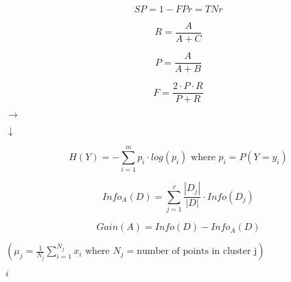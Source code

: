 \documentclass[10pt]{book}
\begin{document}
\begin{mdSnippets}
\begin{mdDisplaySnippet}
\[  SP = 1 - FPr = TNr
\]%
\end{mdDisplaySnippet}%
\begin{mdDisplaySnippet}[ba82f48a43ef0894d62cc5c64647ffde]%
\[%
  R = \frac{A}{A+C}
\]%
\end{mdDisplaySnippet}%
\begin{mdDisplaySnippet}%
\[%
  P = \frac{A}{A+B}
\]%
\end{mdDisplaySnippet}%
\begin{mdDisplaySnippet}[ed20a79ddbdd6c86e3ce04fd31c21666]%
\[%
  F = \frac{2 \cdot P \cdot R}{P + R}
\]%
\end{mdDisplaySnippet}%
\begin{mdInlineSnippet}[0a183ed5142c1166275da8fb1cbbd43f]%
$\rightarrow$\end{mdInlineSnippet}%
\begin{mdInlineSnippet}[42ae4615838c20bda1769756b7078922]%
$\downarrow$\end{mdInlineSnippet}%
\begin{mdDisplaySnippet}[3274f67c0f14a01faf1c72d1c8c33393]%
\[%
H(Y) = -\sum_{i=1}^m p_i \cdot log(p_i) \text{ where } p_i = P(Y=y_i)
\]%
\end{mdDisplaySnippet}%
\begin{mdDisplaySnippet}%
\[%
  Info_A(D) = \sum_{j=1}^{v} \frac{|D_j|}{|D|} \cdot Info(D_j)
\]%
\end{mdDisplaySnippet}%
\begin{mdDisplaySnippet}[9b503ca4d3347f05c2988351b9a864aa]%
\[%
  Gain(A) = Info(D) - Info_A(D)
\]%
\end{mdDisplaySnippet}%
\begin{mdInlineSnippet}[9a93ad69c8fd22c2ab4453323e2d6a6e]%
$\left(\mu_j = \frac{1}{N_j} \sum_{i=1}^{N_j} x_i \text{ where } N_j = \text{number of points in cluster j}\right)$\end{mdInlineSnippet}%
\begin{mdInlineSnippet}[865c0c0b4ab0e063e5caa3387c1a8741]%
$i$\end{mdInlineSnippet}%
\begin{mdInlineSnippet}[7b774effe4a349c6dd82ad4f4f21d34c]%

\end{mdInlineSnippet}
\end{mdSnippets}
\end{document}
